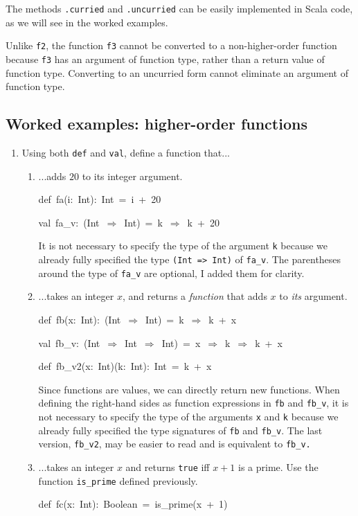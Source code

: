 The methods \lstinline!.curried! and \lstinline!.uncurried! can
be easily implemented in Scala code, as we will see in the worked
examples.

Unlike \lstinline!f2!, the function \lstinline!f3! cannot be converted
to a non-higher-order function because \lstinline!f3! has an argument
of function type, rather than a return value of function type. Converting
to an uncurried form cannot eliminate an argument of function type.

\subsection{Worked examples: higher-order functions}
\begin{enumerate}
\item Using both \lstinline!def! and \lstinline!val!, define a function
that...
\begin{enumerate}
\item ...adds $20$ to its integer argument.
\begin{lyxcode}
def~fa(i:~Int):~Int~=~i~+~20

val~fa\_v:~(Int~$\Rightarrow$~Int)~=~k~$\Rightarrow$~k~+~20
\end{lyxcode}
It is not necessary to specify the type of the argument \texttt{k}
because we already fully specified the type \texttt{(Int => Int)}
of \texttt{fa\_v}. The parentheses around the type of \texttt{fa\_v}
are optional, I added them for clarity.
\item ...takes an integer $x$, and returns a \emph{function} that adds
$x$ to \emph{its} argument.
\begin{lyxcode}
def~fb(x:~Int):~(Int~$\Rightarrow$~Int)~=~k~$\Rightarrow$~k~+~x

val~fb\_v:~(Int~$\Rightarrow$~Int~$\Rightarrow$~Int)~=~x~$\Rightarrow$~k~$\Rightarrow$~k~+~x

def~fb\_v2(x:~Int)(k:~Int):~Int~=~k~+~x
\end{lyxcode}
Since functions are values, we can directly return new functions.
When defining the right-hand sides as function expressions in \texttt{fb}
and \texttt{fb\_v}, it is not necessary to specify the type of the
arguments \texttt{x} and \texttt{k} because we already fully specified
the type signatures of \texttt{fb} and \texttt{fb\_v}. The last version,
\texttt{fb\_v2}, may be easier to read and is equivalent to \texttt{fb\_v.}
\item ...takes an integer $x$ and returns \texttt{true} iff $x+1$ is a
prime. Use the function \texttt{is\_prime} defined previously.
\begin{lyxcode}
def~fc(x:~Int):~Boolean~=~is\_prime(x~+~1)


\end{lyxcode}
\end{enumerate}
\end{enumerate}
